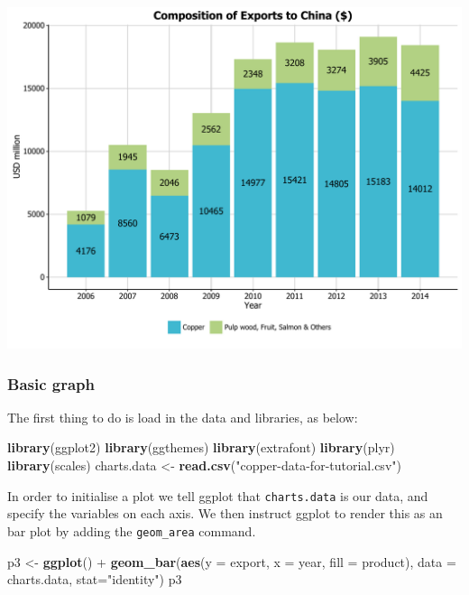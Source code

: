 \documentclass[]{article}
\newenvironment{Shaded}{\begin{snugshade}}{\end{snugshade}}
\newcommand{\KeywordTok}[1]{\textcolor[rgb]{0.13,0.29,0.53}{\textbf{{#1}}}}
\newcommand{\DataTypeTok}[1]{\textcolor[rgb]{0.13,0.29,0.53}{{#1}}}
\newcommand{\StringTok}[1]{\textcolor[rgb]{0.31,0.60,0.02}{{#1}}}
\newcommand{\NormalTok}[1]{{#1}}
\begin{document}
\begin{center}\includegraphics{0_all_posts_pdf/bar_final-1} \end{center}

\subsubsection{Basic graph}\label{basic-graph-2}

The first thing to do is load in the data and libraries, as below:

\begin{Shaded}
\begin{Highlighting}[]
\KeywordTok{library}\NormalTok{(ggplot2)}
\KeywordTok{library}\NormalTok{(ggthemes)}
\KeywordTok{library}\NormalTok{(extrafont)}
\KeywordTok{library}\NormalTok{(plyr)}
\KeywordTok{library}\NormalTok{(scales)}
\NormalTok{charts.data <-}\StringTok{ }\KeywordTok{read.csv}\NormalTok{(}\StringTok{"copper-data-for-tutorial.csv"}\NormalTok{)}
\end{Highlighting}
\end{Shaded}

In order to initialise a plot we tell ggplot that \texttt{charts.data}
is our data, and specify the variables on each axis. We then instruct
ggplot to render this as an bar plot by adding the \texttt{geom\_area}
command.

\begin{Shaded}
\begin{Highlighting}[]
\NormalTok{p3 <-}\StringTok{ }\KeywordTok{ggplot}\NormalTok{() +}\StringTok{ }\KeywordTok{geom_bar}\NormalTok{(}\KeywordTok{aes}\NormalTok{(}\DataTypeTok{y =} \NormalTok{export, }\DataTypeTok{x =} \NormalTok{year, }\DataTypeTok{fill =} \NormalTok{product), }\DataTypeTok{data =} \NormalTok{charts.data, }
                          \DataTypeTok{stat=}\StringTok{"identity"}\NormalTok{)}
\NormalTok{p3}
\end{Highlighting}
\end{Shaded}
\end{document}
